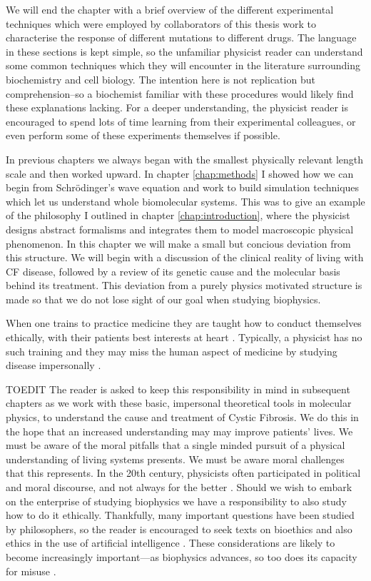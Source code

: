 We will end the chapter with a brief overview of the different experimental techniques which were employed by collaborators of this thesis work to characterise the response of different mutations to different drugs. The language in these sections is kept simple, so the unfamiliar physicist reader can understand some common techniques which they will encounter in the literature surrounding biochemistry and cell biology. The intention here is not replication but comprehension--so a biochemist familiar with these procedures would likely find these explanations lacking. For a deeper understanding, the physicist reader is encouraged to spend lots of time learning from their experimental colleagues, or even perform some of these experiments themselves if possible. 

In previous chapters we always began with the smallest physically relevant length scale and then worked upward. In chapter \ref{chap:methods} I showed how we can begin from Schr\"odinger's wave equation and work to build simulation techniques which let us understand whole biomolecular systems. This was to give an example of the philosophy I outlined in chapter \ref{chap:introduction}, where the physicist designs abstract formalisms and integrates them to model macroscopic physical phenomenon. In this chapter we will make a small but concious deviation from this structure. We will begin with a discussion of the clinical reality of living with CF disease, followed by a review of its genetic cause and the molecular basis behind its treatment. This deviation from a purely physics motivated structure is made so that we do not lose sight of our goal when studying biophysics.

When one trains to practice medicine they are taught how to conduct themselves ethically, with their patients best interests at heart \cite{hajar2017}. Typically, a physicist has no such training and they may miss the human aspect of medicine by studying disease impersonally \cite{foucault1994}. 

TOEDIT The reader is asked to keep this responsibility in mind in subsequent chapters as we work with these basic, impersonal theoretical tools in molecular physics, to understand the cause and treatment of Cystic Fibrosis. We do this in the hope that an increased understanding may may improve patients' lives. We must be aware of the moral pitfalls that a single minded pursuit of a physical understanding of living systems presents. We must be aware moral challenges that this represents. In the 20th century, physicists often participated in political and moral discourse, and not always for the better \cite{frank1993, gottfried1999, global2009, rhodes1986, aaronson2008, berger2016, vonneumann_britanica}. Should we wish to embark on the enterprise of studying biophysics we have a responsibility to also study how to do it ethically. Thankfully, many important questions have been studied by philosophers, so the reader is encouraged to seek texts on bioethics and also ethics in the use of artificial intelligence \cite{buchanan2000, taneri2011, genome_editting_guildelines_2017, muller2021, bostrom2014}. These considerations are likely to become increasingly important---as biophysics advances, so too does its capacity for misuse \cite{mallapaty2022, urbina2022}. 


